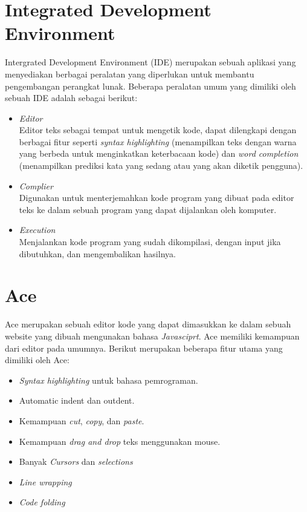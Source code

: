 \section{Integrated Development Environment}
\label{sec:2:ide}

Intergrated Development Environment (IDE) merupakan sebuah aplikasi yang menyediakan berbagai peralatan yang diperlukan untuk membantu pengembangan perangkat lunak. Beberapa peralatan umum yang dimiliki oleh sebuah IDE adalah sebagai berikut:

\begin{itemize}
	\item \textit{Editor} \\
	      Editor teks sebagai tempat untuk mengetik kode, dapat dilengkapi dengan berbagai fitur seperti \textit{syntax highlighting} (menampilkan teks dengan warna yang berbeda untuk menginkatkan keterbacaan kode) dan \textit{word completion} (menampilkan prediksi kata yang sedang atau yang akan diketik pengguna).
	\item \textit{Complier} \\
	      Digunakan untuk menterjemahkan kode program yang dibuat pada editor teks ke dalam sebuah program yang dapat dijalankan oleh komputer.
	\item \textit{Execution} \\
	      Menjalankan kode program yang sudah dikompilasi, dengan input jika dibutuhkan, dan mengembalikan hasilnya.
\end{itemize}

\section{Ace}
\label{sec:2:ace}

Ace merupakan sebuah editor kode yang dapat dimasukkan ke dalam sebuah website yang dibuah mengunakan bahasa \textit{Javasciprt}. Ace memiliki kemampuan dari editor pada umumnya. Berikut merupakan beberapa fitur utama yang dimiliki oleh Ace:

\begin{itemize}
	\item \textit{Syntax highlighting} untuk bahasa pemrograman.
	\item Automatic indent dan  outdent.
	\item Kemampuan \textit{cut}, \textit{copy}, dan \textit{paste}.
	\item Kemampuan \textit{drag and drop} teks menggunakan mouse.
	\item Banyak \textit{Cursors} dan \textit{selections}
	\item \textit{Line wrapping}
	\item \textit{Code folding}
\end{itemize}

